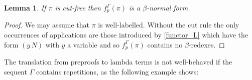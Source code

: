 \documentclass[english,letter paper,12pt,leqno]{article}
\newtheorem{lemma}[theorem]{Lemma}
\theoremstyle{example}
\numberwithin{equation}{section}
\def\imp{\supset}
\begin{document}

\begin{lemma}\label{lemma:cutfree_means_betanormal} If $\pi$ is cut-free then $f^\Gamma_p(\pi)$ is a $\beta$-normal form.
\end{lemma}
\begin{proof}
We may assume that $\pi$ is well-labelled. Without the cut rule the only occurrences of applications are those introduced by  \eqref{functor_L} which have the form $(y \, N)$ with $y$ a variable and so $f^\Gamma_p(\pi)$ contains no $\beta$-redexes.
\end{proof}

The translation from preproofs to lambda terms is not well-behaved if the sequent $\Gamma$ contains repetitions, as the following example shows:
\end{document}

